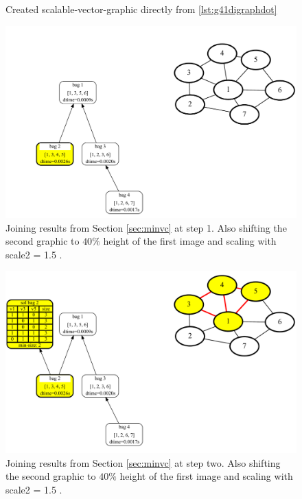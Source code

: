 \documentclass[a4paper, 12pt, bibliography=totoc]{scrartcl}
\begin{document}
\begin{figure}[H]
	\caption{Created scalable-vector-graphic directly from \ref{lst:g41digraphdot}}
	\label{fig:g41Digraph}
\end{figure}



\begin{figure}[H]
	\centering
	\includegraphics[width=0.9\linewidth,height=0.9\textheight,keepaspectratio]{images/SVGJOIN/default_06sc151.pdf}
	\caption[Joining results from Section \ref{sec:minvc} at step 1/5]{Joining results from Section \ref{sec:minvc} at step 1. Also shifting the second graphic to $40\%$ height of the first image and scaling with scale2 = 1.5 .}
	\label{fig:joinscaled1}
\end{figure}
\begin{figure}[H]
	\centering
	\includegraphics[width=0.9\linewidth,height=0.9\textheight,keepaspectratio]{images/SVGJOIN/default_06sc152.pdf}
	\caption[Joining results from Section \ref{sec:minvc} at step two/5]{Joining results from Section \ref{sec:minvc} at step two. Also shifting the second graphic to $40\%$ height of the first image and scaling with scale2 = 1.5 .}
	\label{fig:joinscaled2}
\end{figure}
\end{document}
